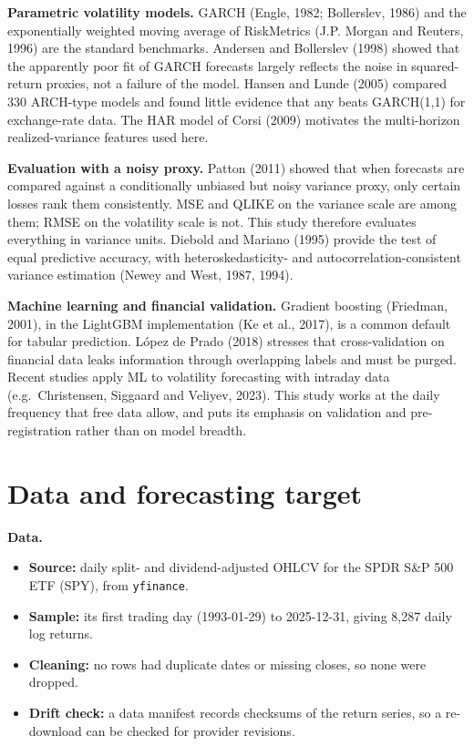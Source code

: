 \documentclass[11pt]{article}
\providecommand{\tightlist}{\setlength{\itemsep}{0pt}\setlength{\parskip}{0pt}}
\begin{document}
\textbf{Parametric volatility models.} GARCH (Engle, 1982; Bollerslev, 1986)
and the exponentially weighted moving average of RiskMetrics (J.P. Morgan
and Reuters, 1996) are the standard benchmarks. Andersen and Bollerslev
(1998) showed that the apparently poor fit of GARCH forecasts largely
reflects the noise in squared-return proxies, not a failure of the model.
Hansen and Lunde (2005) compared 330 ARCH-type models and found little
evidence that any beats GARCH(1,1) for exchange-rate data. The HAR model of
Corsi (2009) motivates the multi-horizon realized-variance features used
here.

\textbf{Evaluation with a noisy proxy.} Patton (2011) showed that when forecasts
are compared against a conditionally unbiased but noisy variance proxy,
only certain losses rank them consistently. MSE and QLIKE on the variance
scale are among them; RMSE on the volatility scale is not. This study
therefore evaluates everything in variance units. Diebold and Mariano
(1995) provide the test of equal predictive accuracy, with
heteroskedasticity- and autocorrelation-consistent variance estimation
(Newey and West, 1987, 1994).

\textbf{Machine learning and financial validation.} Gradient boosting (Friedman,
2001), in the LightGBM implementation (Ke et al., 2017), is a common
default for tabular prediction. López de Prado (2018) stresses that
cross-validation on financial data leaks information through overlapping
labels and must be purged. Recent studies apply ML to volatility forecasting
with intraday data (e.g.~Christensen, Siggaard and Veliyev, 2023). This
study works at the daily frequency that free data allow, and puts its
emphasis on validation and pre-registration rather than on model breadth.

\hypertarget{data-and-forecasting-target}{%
\section{Data and forecasting target}\label{data-and-forecasting-target}}

\textbf{Data.}

\begin{itemize}
\tightlist
\item
  \textbf{Source:} daily split- and dividend-adjusted OHLCV for the SPDR S\&P
  500 ETF (SPY), from \texttt{yfinance}.
\item
  \textbf{Sample:} its first trading day (1993-01-29) to 2025-12-31, giving
  8,287 daily log returns.
\item
  \textbf{Cleaning:} no rows had duplicate dates or missing closes, so none
  were dropped.
\item
  \textbf{Drift check:} a data manifest records checksums of the return series,
  so a re-download can be checked for provider revisions.
\end{itemize}
\end{document}

